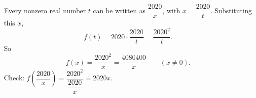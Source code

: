 Every nonzero real number $t$ can be written as $\dfrac{2020}{x}$, with $x=\dfrac{2020}{t}$. Substituting this $x$,
\[f(t)=2020\cdot\dfrac{2020}{t}=\dfrac{2020^2}{t}.\]
So
\[f(x)=\boxed{\dfrac{2020^2}{x}}=\dfrac{4080400}{x}\qquad(x\ne0).\]
Check: $f\left(\dfrac{2020}{x}\right)=\dfrac{2020^2}{\dfrac{2020}{x}}=2020x$.
